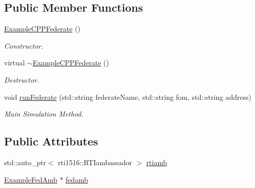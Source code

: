 \subsection*{Public Member Functions}
\begin{DoxyCompactItemize}
\item 
\hypertarget{class_example_c_p_p_federate_abf1c885a01fb942a1120f8ea1b93b511}{
\hyperlink{class_example_c_p_p_federate_abf1c885a01fb942a1120f8ea1b93b511}{ExampleCPPFederate} ()}
\label{class_example_c_p_p_federate_abf1c885a01fb942a1120f8ea1b93b511}

\begin{DoxyCompactList}\small\item\em Constructor. \item\end{DoxyCompactList}\item 
\hypertarget{class_example_c_p_p_federate_a7b5810837c8fd7e5dadcf8ff84bfb6ec}{
virtual \hyperlink{class_example_c_p_p_federate_a7b5810837c8fd7e5dadcf8ff84bfb6ec}{$\sim$ExampleCPPFederate} ()}
\label{class_example_c_p_p_federate_a7b5810837c8fd7e5dadcf8ff84bfb6ec}

\begin{DoxyCompactList}\small\item\em Destructor. \item\end{DoxyCompactList}\item 
void \hyperlink{class_example_c_p_p_federate_a1b8a60b635555f1723eab0bde159f5f5}{runFederate} (std::string federateName, std::string fom, std::string address)
\begin{DoxyCompactList}\small\item\em Main Simulation Method. \item\end{DoxyCompactList}\end{DoxyCompactItemize}
\subsection*{Public Attributes}
\begin{DoxyCompactItemize}
\item 
std::auto\_\-ptr$<$ rti1516::RTIambassador $>$ \hyperlink{class_example_c_p_p_federate_ac4d4b4416ce7ab50284c6a3c2deecaa4}{rtiamb}
\item 
\hyperlink{class_example_fed_amb}{ExampleFedAmb} $\ast$ \hyperlink{class_example_c_p_p_federate_acc3635b1ef16e90ac4fad62150808f1e}{fedamb}
\end{DoxyCompactItemize}
